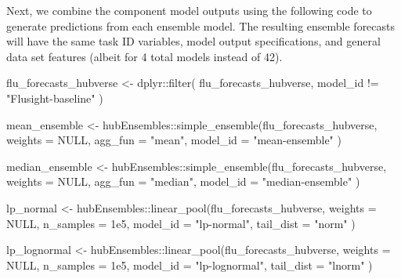 \documentclass[
]{article}
\newenvironment{Shaded}{\begin{snugshade}}{\end{snugshade}}
\newcommand{\AttributeTok}[1]{\textcolor[rgb]{0.40,0.45,0.13}{#1}}
\newcommand{\ConstantTok}[1]{\textcolor[rgb]{0.56,0.35,0.01}{#1}}
\newcommand{\FloatTok}[1]{\textcolor[rgb]{0.68,0.00,0.00}{#1}}
\newcommand{\FunctionTok}[1]{\textcolor[rgb]{0.28,0.35,0.67}{#1}}
\newcommand{\NormalTok}[1]{\textcolor[rgb]{0.00,0.23,0.31}{#1}}
\newcommand{\OtherTok}[1]{\textcolor[rgb]{0.00,0.23,0.31}{#1}}
\newcommand{\SpecialCharTok}[1]{\textcolor[rgb]{0.37,0.37,0.37}{#1}}
\newcommand{\StringTok}[1]{\textcolor[rgb]{0.13,0.47,0.30}{#1}}
\begin{document}
Next, we combine the component model outputs using the following code to
generate predictions from each ensemble model. The resulting ensemble
forecasts will have the same task ID variables, model output
specifications, and general data set features (albeit for 4 total models
instead of 42).

\begin{Shaded}
\begin{Highlighting}[]
\NormalTok{flu\_forecasts\_hubverse }\OtherTok{\textless{}{-}}\NormalTok{ dplyr}\SpecialCharTok{::}\FunctionTok{filter}\NormalTok{(}
\NormalTok{  flu\_forecasts\_hubverse,}
\NormalTok{  model\_id }\SpecialCharTok{!=} \StringTok{"Flusight{-}baseline"}
\NormalTok{)}

\NormalTok{mean\_ensemble }\OtherTok{\textless{}{-}}\NormalTok{ hubEnsembles}\SpecialCharTok{::}\FunctionTok{simple\_ensemble}\NormalTok{(flu\_forecasts\_hubverse,}
  \AttributeTok{weights =} \ConstantTok{NULL}\NormalTok{,}
  \AttributeTok{agg\_fun =} \StringTok{"mean"}\NormalTok{,}
  \AttributeTok{model\_id =} \StringTok{"mean{-}ensemble"}
\NormalTok{)}

\NormalTok{median\_ensemble }\OtherTok{\textless{}{-}}\NormalTok{ hubEnsembles}\SpecialCharTok{::}\FunctionTok{simple\_ensemble}\NormalTok{(flu\_forecasts\_hubverse,}
  \AttributeTok{weights =} \ConstantTok{NULL}\NormalTok{,}
  \AttributeTok{agg\_fun =} \StringTok{"median"}\NormalTok{,}
  \AttributeTok{model\_id =} \StringTok{"median{-}ensemble"}
\NormalTok{)}

\NormalTok{lp\_normal }\OtherTok{\textless{}{-}}\NormalTok{ hubEnsembles}\SpecialCharTok{::}\FunctionTok{linear\_pool}\NormalTok{(flu\_forecasts\_hubverse,}
  \AttributeTok{weights =} \ConstantTok{NULL}\NormalTok{,}
  \AttributeTok{n\_samples =} \FloatTok{1e5}\NormalTok{, }\AttributeTok{model\_id =} \StringTok{"lp{-}normal"}\NormalTok{,}
  \AttributeTok{tail\_dist =} \StringTok{"norm"}
\NormalTok{)}

\NormalTok{lp\_lognormal }\OtherTok{\textless{}{-}}\NormalTok{ hubEnsembles}\SpecialCharTok{::}\FunctionTok{linear\_pool}\NormalTok{(flu\_forecasts\_hubverse,}
  \AttributeTok{weights =} \ConstantTok{NULL}\NormalTok{,}
  \AttributeTok{n\_samples =} \FloatTok{1e5}\NormalTok{,}
  \AttributeTok{model\_id =} \StringTok{"lp{-}lognormal"}\NormalTok{,}
  \AttributeTok{tail\_dist =} \StringTok{"lnorm"}
\NormalTok{)}
\end{Highlighting}
\end{Shaded}
\end{document}
